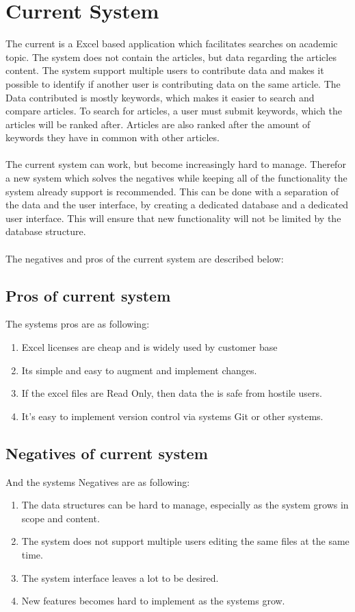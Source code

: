 \section{Current System}

The current is a Excel based application which facilitates searches on academic topic. The system does not contain the articles, but data regarding the articles content. 
The system support multiple users to contribute data and makes it possible to identify if another user is contributing data on the same article. The Data contributed is mostly keywords, which makes it easier to search and compare articles. 
To search for articles, a user must submit keywords, which the articles will be ranked after. Articles are also ranked after the amount of keywords they have in common with other articles. 
\\\\
The current system can work, but become increasingly hard to manage. Therefor a new system which solves the negatives while keeping all of the functionality the system already support is recommended. This can be done with a separation of the data and the user interface, by creating a dedicated database and a dedicated user interface. This will ensure that new functionality will not be limited by the database structure. 
\\\\
The negatives and pros of the current system are described below:

\subsection{Pros of current system}
The systems pros are as following:

\begin{enumerate}
	\item Excel licenses are cheap and is widely used by customer base
	\item Its simple and easy to augment and implement changes.
	\item If the excel files are Read Only, then data the is safe from hostile users.
	\item It's easy to implement version control via systems Git or other systems.
\end{enumerate}

\subsection{Negatives of current system} 
And the systems Negatives are as following: 

\begin{enumerate}
	\item The data structures can be hard to manage, especially as the system grows in scope and content.
	\item The system does not support multiple users editing the same files at the same time.
	\item The system interface leaves a lot to be desired.
	\item New features becomes hard to implement as the systems grow.
\end{enumerate}
